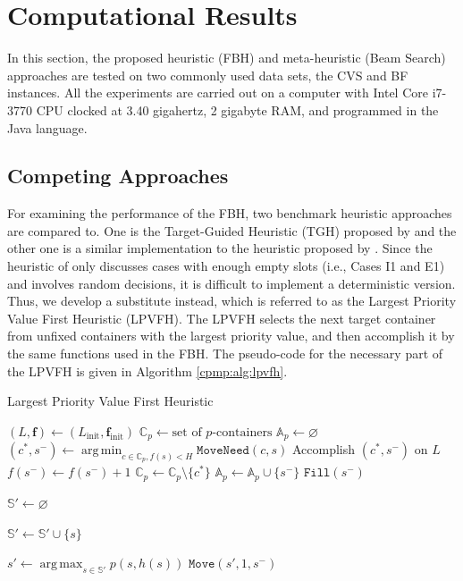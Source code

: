 \documentclass{article}
\DeclareMathOperator*{\argmin}{arg\,min}
\DeclareMathOperator*{\argmax}{arg\,max}
\begin{document}
\section{Computational Results}
\label{cpmp:sec:experiment}


In this section, the proposed heuristic (FBH) and meta-heuristic (Beam Search) approaches are tested on two commonly used data sets, the CVS and BF instances. All the experiments are carried out on a computer with Intel Core i7-3770 CPU clocked at 3.40 gigahertz, 2 gigabyte RAM, and programmed in the Java language.

\subsection{Competing Approaches}

For examining the performance of the FBH, two benchmark heuristic approaches are compared to. One is the Target-Guided Heuristic (TGH) proposed by \cite{Wang201567} and the other one is a similar implementation to the heuristic proposed by \cite{ExpositoIzquierdo20128337}. Since the heuristic of \citep{ExpositoIzquierdo20128337} only discusses cases with enough empty slots (i.e., Cases I1 and E1) and involves random decisions, it is difficult to implement a deterministic version. Thus, we develop a substitute instead, which is referred to as the Largest Priority Value First Heuristic (LPVFH).
The LPVFH selects the next target container from unfixed containers with the largest priority value, and then accomplish it by the same functions used in the FBH\@. The pseudo-code for the necessary part of the LPVFH is given in Algorithm \ref{cpmp:alg:lpvfh}.

\begin{algorithm}[htbp]
\caption{Largest Priority Value First Heuristic}
\label{cpmp:alg:lpvfh}
\Begin
{
  $(L,\boldsymbol{f})\gets (L_\mathrm{init},\boldsymbol{f}_\mathrm{init})$\;
  {
    $\mathbb{C}_p\gets\textrm{set of $p$-containers}$\;
    $\mathbb{A}_p\gets\varnothing$
       {
      $ (c^*, s^-)\gets \argmin_{c\in\mathbb{C}_p, f(s)<H} \mathtt{MoveNeed}(c,s)$\;
    Accomplish $( c^*, s^-)$ on $L$\;
    $f(s^-)\gets f(s^-)+1$\;
    $\mathbb{C}_p\gets\mathbb{C}_p\setminus\{c^*\}$\;
      $\mathbb{A}_p\gets \mathbb{A}_p\cup \{s^-\}$\;
       }
       {
      $\mathtt{Fill}(s^-)$\;
       }
  }
}


{
  {
    $\mathbb{S}'\gets\varnothing$\;
    {
         
      {
        $\mathbb{S}'\gets \mathbb{S}'\cup \{s\}$\;
      }
    }
    {
      $ s'\gets \argmax_{s\in\mathbb{S}'} p(s,h(s))$\;
      $\mathtt{Move}(s',1,s^-)$\;
    }
    \Else
    {
      \Break\;
    }
  }
}
\end{algorithm}
\end{document}
